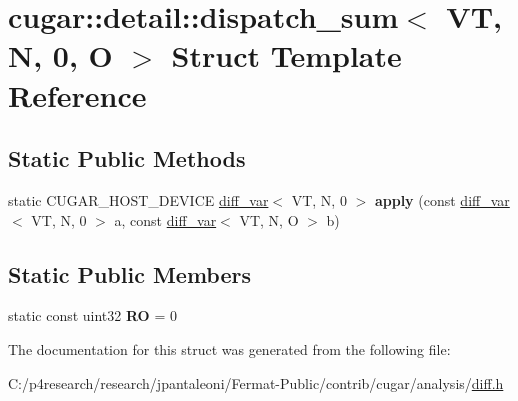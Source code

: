 \hypertarget{structcugar_1_1detail_1_1dispatch__sum_3_01_v_t_00_01_n_00_010_00_01_o_01_4}{}\section{cugar\+:\+:detail\+:\+:dispatch\+\_\+sum$<$ VT, N, 0, O $>$ Struct Template Reference}
\label{structcugar_1_1detail_1_1dispatch__sum_3_01_v_t_00_01_n_00_010_00_01_o_01_4}
\subsection*{Static Public Methods}
\begin{DoxyCompactItemize}
\item 
\mbox{\label{structcugar_1_1detail_1_1dispatch__sum_3_01_v_t_00_01_n_00_010_00_01_o_01_4_a7a25917f5bb12c7cbe57042721f54d12}} 
static C\+U\+G\+A\+R\+\_\+\+H\+O\+S\+T\+\_\+\+D\+E\+V\+I\+CE \hyperlink{structcugar_1_1diff__var}{diff\+\_\+var}$<$ VT, N, 0 $>$ {\bfseries apply} (const \hyperlink{structcugar_1_1diff__var}{diff\+\_\+var}$<$ VT, N, 0 $>$ a, const \hyperlink{structcugar_1_1diff__var}{diff\+\_\+var}$<$ VT, N, O $>$ b)
\end{DoxyCompactItemize}
\subsection*{Static Public Members}
\begin{DoxyCompactItemize}
\item 
\mbox{\label{structcugar_1_1detail_1_1dispatch__sum_3_01_v_t_00_01_n_00_010_00_01_o_01_4_a21932bfdd680e0e3c8db758879b4a235}} 
static const uint32 {\bfseries RO} = 0
\end{DoxyCompactItemize}


The documentation for this struct was generated from the following file\+:\begin{DoxyCompactItemize}
\item 
C\+:/p4research/research/jpantaleoni/\+Fermat-\/\+Public/contrib/cugar/analysis/\hyperlink{diff_8h}{diff.\+h}\end{DoxyCompactItemize}
